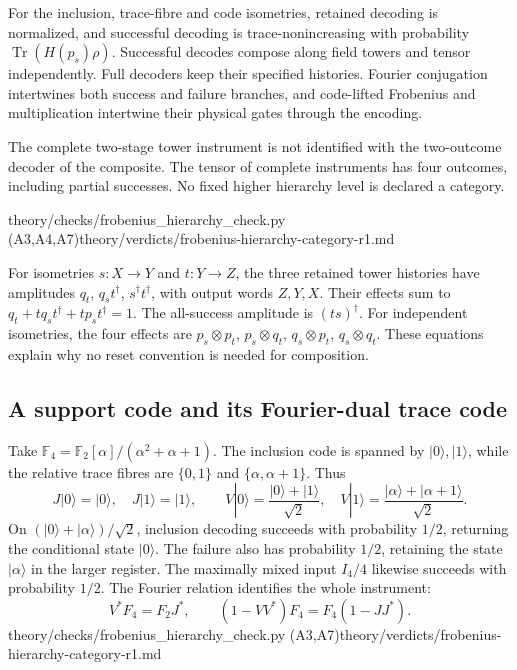 \begin{theorem}
\statusProved
For the inclusion, trace-fibre and code isometries, retained decoding is
normalized, and successful decoding is trace-nonincreasing with probability
$\operatorname{Tr}(H(p_s)\rho)$. Successful decodes compose along field towers
and tensor independently. Full decoders keep their specified histories.
Fourier conjugation intertwines both success and failure branches, and
code-lifted Frobenius and multiplication intertwine their physical gates
through the encoding.
\end{theorem}
\begin{scope}
The complete two-stage tower instrument is not identified with the
two-outcome decoder of the composite. The tensor of complete instruments
has four outcomes, including partial successes. No fixed higher hierarchy
level is declared a category.
\end{scope}
{theory/checks/frobenius\_hierarchy\_check.py (A3,A4,A7)}{theory/verdicts/frobenius-hierarchy-category-r1.md}

For isometries $s:X\to Y$ and $t:Y\to Z$, the three retained tower histories
have amplitudes $q_t$, $q_st^\dagger$, $s^\dagger t^\dagger$, with output
words $Z,Y,X$. Their effects sum to
$q_t+tq_st^\dagger+tp_st^\dagger=1$. The all-success amplitude is
$(ts)^\dagger$. For independent isometries, the four effects are
$p_s\otimes p_t$, $p_s\otimes q_t$, $q_s\otimes p_t$, $q_s\otimes q_t$.
These equations explain why no reset convention is needed for composition.

\subsection*{A support code and its Fourier-dual trace code}
Take $\mathbb F_4=\mathbb F_2[\alpha]/(\alpha^2+\alpha+1)$.
The inclusion code is spanned by $|0\rangle,|1\rangle$, while the relative
trace fibres are $\{0,1\}$ and $\{\alpha,\alpha+1\}$. Thus
\[
 J|0\rangle=|0\rangle,\quad J|1\rangle=|1\rangle,\qquad
 V|0\rangle=\frac{|0\rangle+|1\rangle}{\sqrt2},\quad
 V|1\rangle=\frac{|\alpha\rangle+|\alpha+1\rangle}{\sqrt2}.
\]
On $(|0\rangle+|\alpha\rangle)/\sqrt2$, inclusion decoding succeeds with
probability $1/2$, returning the conditional state $|0\rangle$. The failure
also has probability $1/2$, retaining the state $|\alpha\rangle$ in the
larger register. The maximally mixed input $I_4/4$ likewise succeeds with
probability $1/2$. The Fourier relation identifies the whole instrument:
\[
 V^*F_4=F_2J^*,\qquad (1-VV^*)F_4=F_4(1-JJ^*).
\]
{theory/checks/frobenius\_hierarchy\_check.py (A3,A7)}{theory/verdicts/frobenius-hierarchy-category-r1.md}

